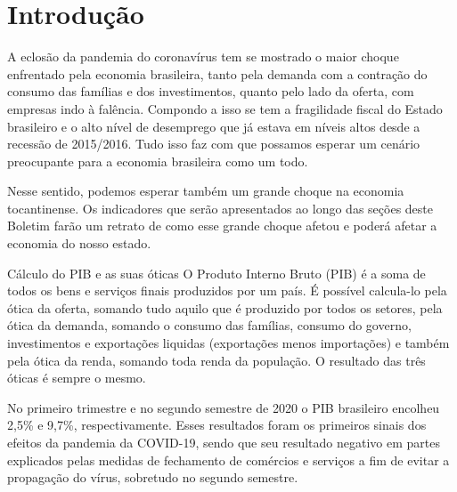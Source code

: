 \chapter{Introdução}
\par A eclosão da pandemia do coronavírus tem se mostrado o maior choque enfrentado pela economia brasileira, tanto pela demanda com a contração do consumo das famílias e dos investimentos, quanto pelo lado da oferta, com empresas indo à falência. Compondo a isso se tem a fragilidade fiscal do Estado brasileiro e o alto nível de desemprego que já estava em níveis altos desde a recessão de 2015/2016. Tudo isso faz com que possamos esperar um cenário preocupante para a economia brasileira como um todo.
\par Nesse sentido, podemos esperar também um grande choque na economia tocantinense. Os indicadores que serão apresentados ao longo das seções deste Boletim farão um retrato de como esse grande choque afetou e poderá afetar a economia do nosso estado.
\begin{smbox}[label={labelbox},nameref={Cálculo do PIB e as suas óticas}]{Cálculo do PIB e as suas óticas}
	O Produto Interno Bruto (PIB) é a soma de todos os bens e serviços finais produzidos por um país. É possível calcula-lo pela ótica da oferta, somando tudo aquilo que é produzido por todos os setores, pela ótica da demanda, somando o consumo das famílias, consumo do governo, investimentos e exportações liquidas (exportações menos importações) e também pela ótica da renda, somando toda renda da população. O resultado das três óticas é sempre o mesmo.
\end{smbox}
\par No primeiro trimestre e no segundo semestre de 2020 o PIB brasileiro encolheu 2,5\% e 9,7\%, respectivamente. Esses resultados foram os primeiros sinais dos efeitos da pandemia da COVID-19, sendo que seu resultado negativo em partes explicados pelas medidas de fechamento de comércios e serviços a fim de evitar a propagação do vírus, sobretudo no segundo semestre.


